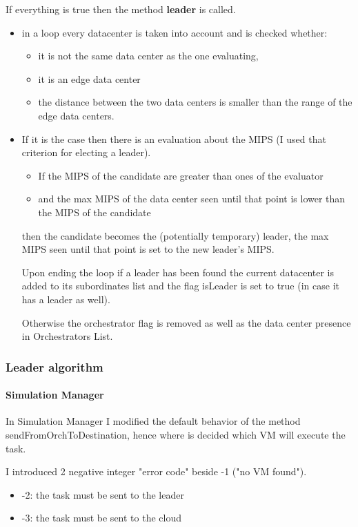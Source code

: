 \documentclass[12pt]{report}
\begin{document}
If everything is true then the method \textbf{leader} is called.
  	\begin{itemize}
 		\item in a loop every datacenter is taken into account and is checked whether:
 		\begin{itemize}
 			\item it is not the same data center as the one evaluating,
 			\item it is an edge data center
 			\item the distance between the two data centers is smaller than the range of the edge data centers.
 		\end{itemize}
 		\item If it is the case then there is an evaluation about the MIPS (I used that criterion for electing a leader).
 		\begin{itemize}
 			\item If the MIPS of the candidate are greater than ones of the evaluator
 			\item and the max MIPS of the data center seen until that point is lower than the MIPS of the candidate
 		\end{itemize}

then the candidate becomes the (potentially temporary) leader, the max MIPS seen until that point is set to the new leader's MIPS.

Upon ending the loop if a leader has been found the current datacenter is added to its subordinates list and the flag isLeader is set to true (in case it has a leader as well).
 		
Otherwise the orchestrator flag is removed as well as the data center presence in Orchestrators List.
  	\end{itemize}
\subsubsection*{Leader algorithm}
\paragraph{Simulation Manager}

In Simulation Manager I modified the default behavior of the method sendFromOrchToDestination, hence where is decided which VM will execute the task.

I introduced 2 negative integer "error code" beside -1 ("no VM found").
\begin{itemize}
	\item -2: the task must be sent to the leader
	\item -3: the task must be sent to the cloud
\end{itemize}
\end{document}
